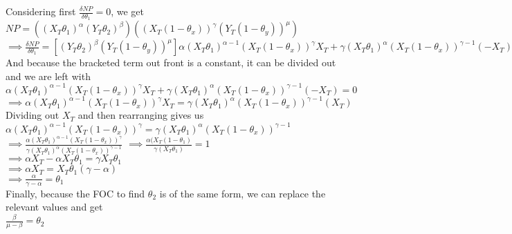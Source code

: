 \documentclass[11pt]{article}
\begin{document}
Considering first $\frac{\delta NP}{\delta \theta_1} = 0$, we get\\
\bigskip
$NP = ((X_T\theta_1)^\alpha (Y_T\theta_2)^\beta)((X_T(1-\theta_x))^\gamma (Y_T(1-\theta_y))^\mu)$\\
\bigskip
$\implies \frac{\delta NP}{\delta \theta_1} = [(Y_T\theta_2)^\beta (Y_T(1-\theta_y))^\mu]\alpha (X_T\theta_1)^{\alpha-1}(X_T(1-\theta_x))^\gamma X_T + \gamma (X_T\theta_1)^\alpha (X_T(1-\theta_x))^{\gamma -1}(-X_T) = 0$\\
\bigskip
And because the bracketed term out front is a constant, it can be divided out and we are left with\\
\bigskip
$\alpha (X_T\theta_1)^{\alpha-1}(X_T(1-\theta_x))^\gamma X_T + \gamma (X_T\theta_1)^\alpha (X_T(1-\theta_x))^{\gamma -1}(-X_T) = 0$\\
\bigskip
$\implies \alpha (X_T\theta_1)^{\alpha-1}(X_T(1-\theta_x))^\gamma X_T = \gamma (X_T\theta_1)^\alpha (X_T(1-\theta_x))^{\gamma -1}(X_T)$\\
\bigskip Dividing out $X_T$ and then rearranging gives us\\
\bigskip
$\alpha (X_T\theta_1)^{\alpha-1}(X_T(1-\theta_x))^\gamma = \gamma (X_T\theta_1)^\alpha (X_T(1-\theta_x))^{\gamma -1}$\\
\bigskip
$\implies \frac{\alpha (X_T\theta_1)^{\alpha-1}(X_T(1-\theta_x))^\gamma}{\gamma (X_T\theta_1)^\alpha (X_T(1-\theta_x))^{\gamma -1}}$
\bigskip
$\implies \frac{\alpha (X_T(1-\theta_1)}{\gamma (X_T\theta_1)} = 1$\\
\bigskip
$\implies \alpha X_T - \alpha X_T\theta_1 = \gamma X_T\theta_1$\\
\bigskip
$\implies \alpha X_T = X_T\theta_1(\gamma - \alpha)$\\
\bigskip
$\implies \frac{\alpha}{\gamma - \alpha} = \theta_1$\\
\bigskip
Finally, because the FOC to find $\theta_2$ is of the same form, we can replace the relevant values and get\\
\bigskip
$\frac{\beta}{\mu - \beta} = \theta_2$
\end{document}
